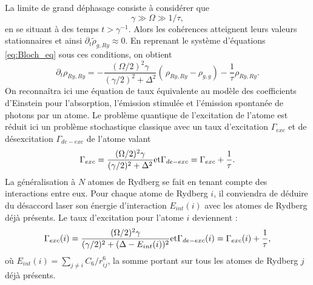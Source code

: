 La limite de grand déphasage consiste à considérer que
\begin{equation}
\label{eq:strong_dephasing}
\gamma \gg \Omega \gg 1/\tau,
\end{equation}
en se situant à des temps $t > \gamma^{-1}$.
Alors les cohérences atteignent leurs valeurs stationnaires et ainsi $\partial_t \tilde{\rho}_{g,Ry} \approx 0$.
En reprenant le système d'équations \eqref{eq:Bloch_eq} sous ces conditions, on obtient 
\begin{equation}
\label{eq:Bloch_approx}
\partial_t \rho_{Ry,Ry} = -\frac{(\Omega/2)^2 \gamma}{(\gamma/2)^2 + \Delta^2} \left(\frac{}{}\! \rho_{Ry,Ry} - \rho_{g,g} \right) - \frac{1}{\tau} \rho_{Ry,Ry}.
\end{equation}
On reconnaîtra ici une équation de taux équivalente au modèle des coefficients d'Einstein pour l'absorption, l'émission stimulée et l'émission spontanée de photons par un atome.
Le problème quantique de l'excitation de l'atome est réduit ici un problème stochastique classique avec un taux d'excitation $\Gamma_{exc}$ et de désexcitation $\Gamma_{de-exc}$ de l'atome valant
\begin{equation}
\label{eq:exc_de-exc_rate_1at}
\Gamma_{exc} = \frac{(\Omega/2)^2 \gamma}{(\gamma/2)^2 + \Delta^2} \hfill \text{et} \hfill
\Gamma_{de-exc} = \Gamma_{exc}+\frac{1}{\tau}. \hfill
\end{equation}
La généralisation à $N$ atomes de Rydberg se fait en tenant compte des interactions entre eux.
Pour chaque atome de Rydberg $i$, il conviendra de déduire du désaccord laser son énergie d'interaction $E_{int}(i)$ avec les atomes de Rydberg déjà présents.
Le taux d'excitation pour l'atome $i$ deviennent :
\begin{equation}
\label{eq:exc_de-exc_rate_atomi}
\Gamma_{exc}(i) = \frac{(\Omega/2)^2 \gamma}{(\gamma/2)^2 + (\Delta - E_{int}(i))^2} \hfill \text{et} \hfill
\Gamma_{de-exc}(i) = \Gamma_{exc}(i)+\frac{1}{\tau}, \hfill
\end{equation}
où $E_{int}(i) = \sum_{j\neq i} C_6/r_{ij}^6$, la somme portant sur tous les atomes de Rydberg $j$ déjà présents.

